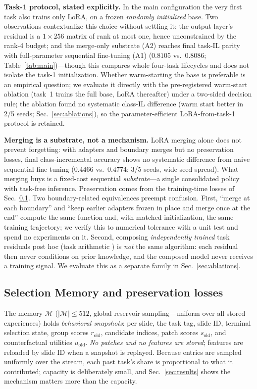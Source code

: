 \documentclass{article}
\begin{document}
\textbf{Task-1 protocol, stated explicitly.} In the main configuration the very first task also trains only LoRA, on a frozen \emph{randomly initialized} base. Two observations contextualize this choice without settling it: the output layer's residual is a $1{\times}256$ matrix of rank at most one, hence unconstrained by the rank-4 budget; and the merge-only substrate (A2) reaches final task-IL parity with full-parameter sequential fine-tuning (A1) ($0.8105$ vs.\ $0.8086$; Table~\ref{tab:main})---though this compares whole four-task lifecycles and does not isolate the task-1 initialization. Whether warm-starting the base is preferable is an empirical question; we evaluate it directly with the pre-registered warm-start ablation (task~1 trains the full base, LoRA thereafter) under a two-sided decision rule; the ablation found no systematic class-IL difference (warm start better in 2/5 seeds; Sec.~\ref{sec:ablations}), so the parameter-efficient LoRA-from-task-1 protocol is retained.

\textbf{Merging is a substrate, not a mechanism.} LoRA merging alone does not prevent forgetting: with adapters and boundary merges but no preservation losses, final class-incremental accuracy shows no systematic difference from naive sequential fine-tuning ($0.4466$ vs.\ $0.4774$; 3/5 seeds, wide seed spread). What merging buys is a fixed-cost sequential \emph{substrate}---a single consolidated policy with task-free inference. Preservation comes from the training-time losses of Sec.~\ref{ssec:mem}. Two boundary-related equivalences preempt confusion. First, ``merge at each boundary'' and ``keep earlier adapters frozen in place and merge once at the end'' compute the same function and, with matched initialization, the same training trajectory; we verify this to numerical tolerance with a unit test and spend no experiments on it. Second, composing \emph{independently trained} task residuals post hoc (task arithmetic \cite{ilharco2023task}) is \emph{not} the same algorithm: each residual then never conditions on prior knowledge, and the composed model never receives a training signal. We evaluate this as a separate family in Sec.~\ref{sec:ablations}.

\subsection{Selection Memory and preservation losses}
\label{ssec:mem}
The memory $\mathcal{M}$ ($|\mathcal{M}|\le 512$, global reservoir sampling---uniform over all stored experiences) holds \emph{behavioral snapshots}: per slide, the task tag, slide ID, terminal selection state, group scores $r_{\mathrm{old}}$, candidate indices, patch scores $s_{\mathrm{old}}$, and counterfactual utilities $u_{\mathrm{old}}$. \emph{No patches and no features are stored}; features are reloaded by slide ID when a snapshot is replayed. Because entries are sampled uniformly over the stream, each past task's share is proportional to what it contributed; capacity is deliberately small, and Sec.~\ref{sec:results} shows the mechanism matters more than the capacity.
\end{document}
